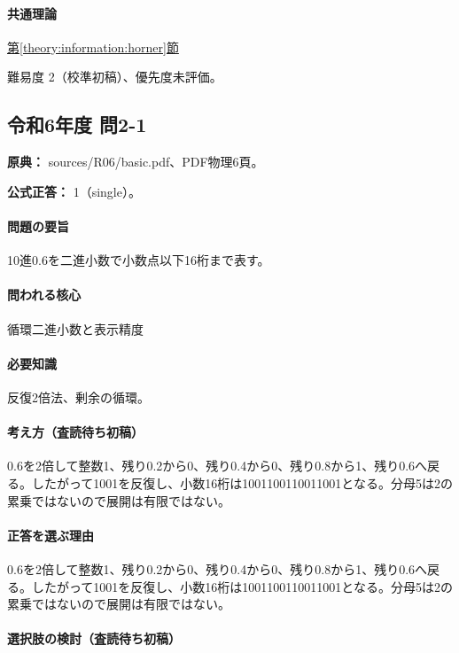 \paragraph{共通理論} \hyperref[theory:information:horner]{第\ref*{theory:information:horner}節}

\par 難易度 2（校準初稿）、優先度未評価。

\subsection{令和6年度 問2-1}
\label{q:r06-reg-basic-2-1}

\noindent\textbf{原典：} sources/R06/basic.pdf、PDF物理6頁。

\textbf{公式正答：} 1（single）。

\paragraph{問題の要旨} 10進0.6を二進小数で小数点以下16桁まで表す。

\paragraph{問われる核心} 循環二進小数と表示精度

\paragraph{必要知識} 反復2倍法、剰余の循環。

\paragraph{考え方（査読待ち初稿）} 0.6を2倍して整数1、残り0.2から0、残り0.4から0、残り0.8から1、残り0.6へ戻る。したがって1001を反復し、小数16桁は1001100110011001となる。分母5は2の累乗ではないので展開は有限ではない。

\paragraph{正答を選ぶ理由} 0.6を2倍して整数1、残り0.2から0、残り0.4から0、残り0.8から1、残り0.6へ戻る。したがって1001を反復し、小数16桁は1001100110011001となる。分母5は2の累乗ではないので展開は有限ではない。

\paragraph{選択肢の検討（査読待ち初稿）}

